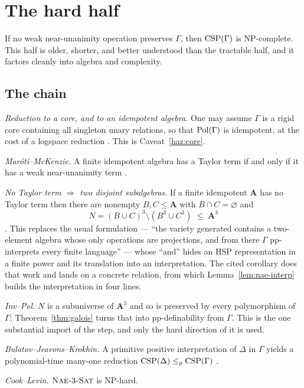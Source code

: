 \section{The hard half}\label{sec:hardness}

If no weak near-unanimity operation preserves $\Gamma$, then $\operatorname{CSP}(\Gamma)$ is
\textup{NP}-complete. This half is older, shorter, and better understood than
the tractable half, and it factors cleanly into algebra and complexity.

\subsection{The chain}

\begin{description}\tightlist
\item[\textup{(1)}] \emph{Reduction to a core, and to an idempotent algebra.}
  One may assume $\Gamma$ is a rigid core containing all singleton unary
  relations, so that $\operatorname{Pol}(\Gamma)$ is idempotent, at the cost of a
  logspace reduction \cite[``Cores and Idempotent Reducts'']{BradyNotes}.
  This is Caveat~\ref{haz:core}.
\item[\textup{(2)}] \emph{Maróti--McKenzie.} A finite idempotent algebra has a
  Taylor term if and only if it has a weak near-unanimity term
  \cite{MarotiMcKenzie}.
\item[\textup{(3)}] \emph{No Taylor term $\Rightarrow$ two disjoint
  subalgebras.} If a finite idempotent $\mathbf A$ has no Taylor term then
  there are nonempty $B,C\le\mathbf A$ with $B\cap C=\varnothing$ and
  \[
    N=(B\cup C)^{3}\setminus(B^{3}\cup C^{3})\;\le\;\mathbf A^{3}
  \]
  \cite[Cor.~1.5.11]{BradyNotes}. This replaces the usual formulation --- ``the
  variety generated contains a two-element algebra whose only operations are
  projections, and from there $\Gamma$ pp-interprets every finite language'' ---
  whose ``and'' hides an \textup{HSP} representation in a finite power and its
  translation into an interpretation. The cited corollary does that work and
  lands on a concrete relation, from which Lemma~\ref{lem:nae-interp} builds
  the interpretation in four lines.
\item[\textup{(3$'$)}] \emph{Inv--Pol.} $N$ is a subuniverse of $\mathbf A^{3}$
  and so is preserved by every polymorphism of $\Gamma$; Theorem~\ref{thm:galois}
  turns that into pp-definability from $\Gamma$. This is the one substantial
  import of the step, and only the hard direction of it is used.
\item[\textup{(4)}] \emph{Bulatov--Jeavons--Krokhin.} A primitive positive
  interpretation of $\Delta$ in $\Gamma$ yields a polynomial-time many-one
  reduction $\operatorname{CSP}(\Delta)\le_{p}\operatorname{CSP}(\Gamma)$ \cite{BJK}.
\item[\textup{(5)}] \emph{Cook--Levin.} $\textsc{Nae-$3$-Sat}$ is
  \textup{NP}-hard.
\end{description}

